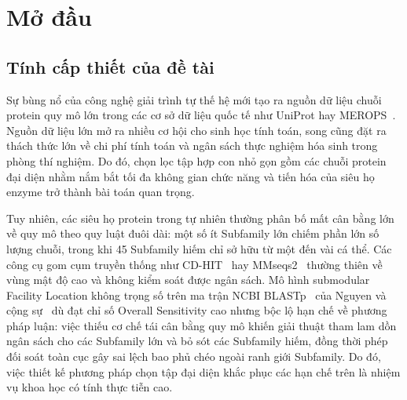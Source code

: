 \chapter*{Mở đầu}
\label{chap:introduction}

\section*{Tính cấp thiết của đề tài}
Sự bùng nổ của công nghệ giải trình tự thế hệ mới tạo ra nguồn dữ liệu chuỗi protein quy mô lớn trong các cơ sở dữ liệu quốc tế như UniProt hay MEROPS~\cite{merops}. Nguồn dữ liệu lớn mở ra nhiều cơ hội cho sinh học tính toán, song cũng đặt ra thách thức lớn về chi phí tính toán và ngân sách thực nghiệm hóa sinh trong phòng thí nghiệm. Do đó, chọn lọc tập hợp con nhỏ gọn gồm các chuỗi protein đại diện nhằm nắm bắt tối đa không gian chức năng và tiến hóa của siêu họ enzyme trở thành bài toán quan trọng.

Tuy nhiên, các siêu họ protein trong tự nhiên thường phân bố mất cân bằng lớn về quy mô theo quy luật đuôi dài: một số ít Subfamily lớn chiếm phần lớn số lượng chuỗi, trong khi 45 Subfamily hiếm chỉ sở hữu từ một đến vài cá thể. Các công cụ gom cụm truyền thống như CD-HIT~\cite{cdhit} hay MMseqs2~\cite{mmseqs2} thường thiên về vùng mật độ cao và không kiểm soát được ngân sách. Mô hình submodular Facility Location không trọng số trên ma trận NCBI BLASTp~\cite{blast} của Nguyen và cộng sự~\cite{nguyen2025} dù đạt chỉ số Overall Sensitivity cao nhưng bộc lộ hạn chế về phương pháp luận: việc thiếu cơ chế tái cân bằng quy mô khiến giải thuật tham lam dồn ngân sách cho các Subfamily lớn và bỏ sót các Subfamily hiếm, đồng thời phép đối soát toàn cục gây sai lệch bao phủ chéo ngoài ranh giới Subfamily. Do đó, việc thiết kế phương pháp chọn tập đại diện khắc phục các hạn chế trên là nhiệm vụ khoa học có tính thực tiễn cao.

